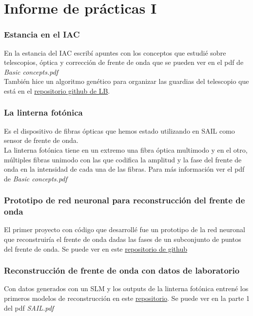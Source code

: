 \part{Informe de prácticas I}

\section{Estancia en el IAC}
En la estancia del IAC escribí apuntes con los conceptos que estudié sobre telescopios, óptica y corrección de frente de onda que se pueden ver en el pdf de \textit{Basic concepts.pdf}\\

También hice un algoritmo genético para organizar las guardias del telescopio que está en el \href{https://github.com/Light-Bridges/fellows}{repositorio github de LB}.

\section{La linterna fotónica}
Es el dispositivo de fibras ópticas que hemos estado utilizando en SAIL como sensor de frente de onda.\\

La linterna fotónica tiene en un extremo una fibra óptica multimodo y en el otro, múltiples fibras unimodo con las que codifica la amplitud y la fase del frente de onda en la intensidad de cada una de las fibras. Para más información ver el pdf de \textit{Basic concepts.pdf}

\section{Prototipo de red neuronal para reconstrucción del frente de onda}
El primer proyecto con código que desarrollé fue un prototipo de la red neuronal que reconstruiría el frente de onda dadas las fases de un subconjunto de puntos del frente de onda. Se puede ver en este \href{https://github.com/Dacarpe03/SurfaceReconstruction}{repositorio de github}

\section{Reconstrucción de frente de onda con datos de laboratorio}
Con datos generados con un SLM y los outputs de la linterna fotónica entrené los primeros modelos de reconstrucción en este \href{https://github.com/Dacarpe03/PLImageReconstruction}{repositorio}. Se puede ver en la parte 1 del pdf \textit{SAIL.pdf}

